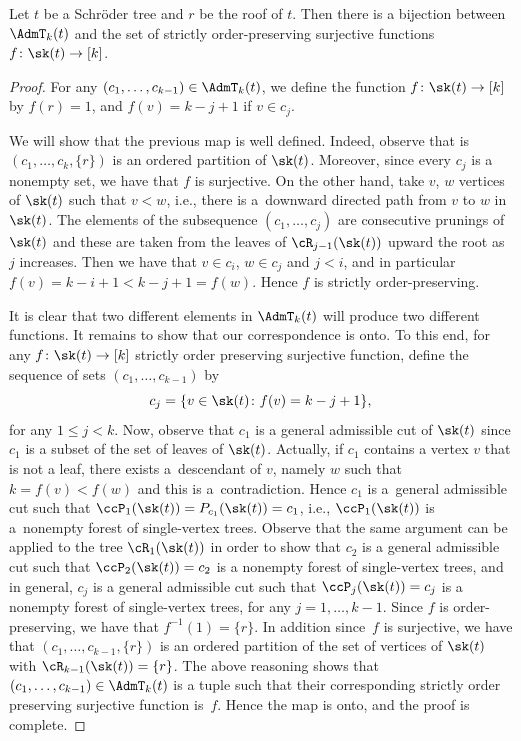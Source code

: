 \begin{Lemma}\label{lemma:bijection}Let $t$ be a Schr\"oder tree and $r$ be the roof of $t$. Then there is a bijection between $\AdmT_k(t)$ and the set of strictly order-preserving surjective functions $f\colon \sk(t)\to [k]$.
\end{Lemma}
\begin{proof}For any $(c_1,\dots,c_{k-1})\in \AdmT_k(t)$, we define the function $f\colon \sk(t)\to[k]$ by $f(r) = 1$, and $f(v) = k - j+1$ if $v\in c_{j}$.

We will show that the previous map is well defined. Indeed, observe that is $(c_1,\dots,c_k,\{r\})$ is an ordered partition of $\sk(t)$. Moreover, since every $c_j$ is a nonempty set, we have that $f$ is surjective. On the other hand, take $v$, $w$ vertices of $\sk(t)$ such that $v<w$, i.e., there is a~downward directed path from $v$ to $w$ in $\sk(t)$. The elements of the subsequence $(c_1,\dots,c_j)$ are consecutive prunings of $\sk(t)$ and these are taken from the leaves of $\cR_{j-1}(\sk(t))$ upward the root as $j$ increases. Then we have that $v\in c_i$, $w\in c_j$ and $j<i$, and in particular $f(v) = k-i+1 < k-j+1 = f(w)$. Hence $f$ is strictly order-preserving.

 It is clear that two different elements in $\AdmT_k(t)$ will produce two different functions. It remains to show that our correspondence is onto. To this end, for any $f\colon \sk(t)\to[k]$ strictly order preserving surjective function, define the sequence of sets $(c_1,\dots,c_{k-1})$ by
 \[
 c_j = \{ v\in \sk(t)\colon f(v) = k-j+1\},
 \]
 for any $1\leq j<k$. Now, observe that $c_1$ is a general admissible cut of $\sk(t)$ since $c_1$ is a subset of the set of leaves of $\sk(t)$. Actually, if $c_1$ contains a vertex $v$ that is not a leaf, there exists a~descendant of $v$, namely $w$ such that $k = f(v) < f(w)$ and this is a~contradiction. Hence $c_1$ is a~general admissible cut such that $\ccP_1(\sk(t)) = P_{c_1}(\sk(t)) = c_1$, i.e., $\ccP_{1}(\sk(t))$ is a~nonempty forest of single-vertex trees. Observe that the same argument can be applied to the tree $\cR_1(\sk(t))$ in order to show that $c_2$ is a general admissible cut such that $\ccP_{2}(\sk(t)) = c_2$ is a nonempty forest of single-vertex trees, and in general, $c_j$ is a general admissible cut such that $\ccP_j(\sk(t))= c_j$ is a nonempty forest of single-vertex trees, for any $j=1,\dots,k-1$. Since $f$ is order-preserving, we have that $f^{-1}(1) = \{r\}$. In addition since~$f$ is surjective, we have that $(c_1,\dots,c_{k-1},\{r\})$ is an ordered partition of the set of vertices of $\sk(t)$ with $\cR_{k-1}(\sk(t)) = \{r\}$. The above reasoning shows that $(c_1,\dots,c_{k-1})\in \AdmT_k(t)$ is a tuple such that their corresponding strictly order preserving surjective function is~$f$. Hence the map is onto, and the proof is complete.
\end{proof}

